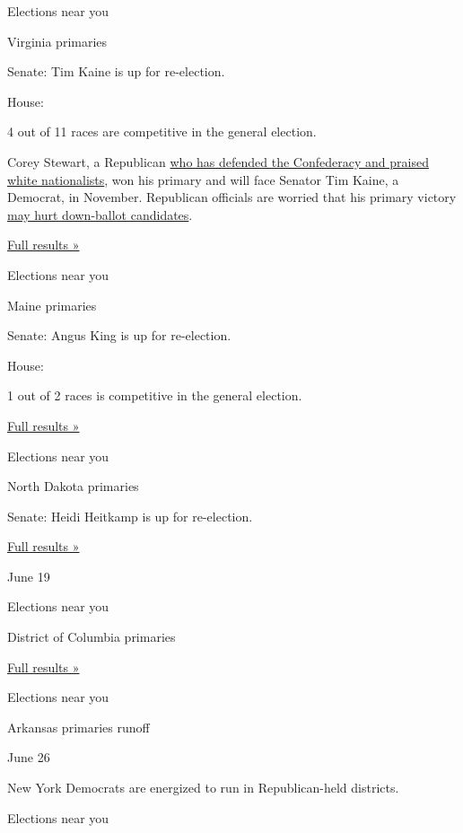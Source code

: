 Elections near you

Virginia primaries

Senate: Tim Kaine is up for re-election.

House:

4 out of 11 races are competitive in the general election.

Corey Stewart, a Republican
\href{https://www.nytimes3xbfgragh.onion/2018/06/17/us/politics/corey-stewart-virginia.html}{who
has defended the Confederacy and praised white nationalists}, won his
primary and will face Senator Tim Kaine, a Democrat, in November.
Republican officials are worried that his primary victory
\href{https://www.nytimes3xbfgragh.onion/2018/06/13/us/corey-stewart-virginia-republicans.html}{may
hurt down-ballot candidates}.

\href{https://www.nytimes3xbfgragh.onion/interactive/2018/06/12/us/elections/results-virginia-primary-elections.html}{Full
results »}

Elections near you

Maine primaries

Senate: Angus King is up for re-election.

House:

1 out of 2 races is competitive in the general election.

\href{https://www.nytimes3xbfgragh.onion/interactive/2018/06/12/us/elections/results-maine-primary-elections.html}{Full
results »}

Elections near you

North Dakota primaries

Senate: Heidi Heitkamp is up for re-election.

\href{https://www.nytimes3xbfgragh.onion/interactive/2018/06/12/us/elections/results-north-dakota-primary-elections.html}{Full
results »}

June 19

Elections near you

District of Columbia primaries

\href{https://www.nytimes3xbfgragh.onion/interactive/2018/06/19/us/elections/results-district-of-columbia-primary-election.html}{Full
results »}

Elections near you

Arkansas primaries runoff

June 26

New York Democrats are energized to run in Republican-held districts.

Elections near you

